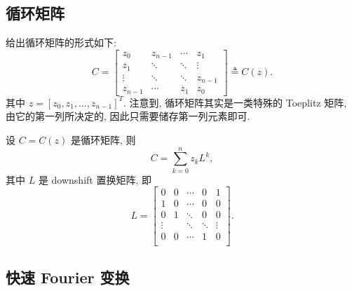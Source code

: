 \documentclass{ecnumaster}
\newcommand{\dis}{\displaystyle}
\begin{document}
\subsection{循环矩阵}
给出循环矩阵的形式如下:
\begin{equation}\label{eq:circulant-matrix}
  C = \left[\begin{matrix} z_0 & z_{n-1} & \cdots & z_{1}\\
  z_1 & \ddots & \ddots & \vdots \\
  \vdots & \ddots & \ddots & z_{n-1}  \\
  z_{n-1} & \cdots & z_1 & z_0  \end{matrix} \right] \triangleq C(z).
\end{equation}
其中 $z = [z_0, z_1, \dots, z_{n-1}]^T.$
注意到, 循环矩阵其实是一类特殊的 Toeplitz 矩阵,
由它的第一列所决定的, 因此只需要储存第一列元素即可.

\begin{lemma}\label{lemma23}
  设 $C = C(z)$ 是循环矩阵, 则
  $$C = \sum_{k=0}^nz_kL^k,$$
  其中 $L$ 是 downshift 置换矩阵\cite{GL13}, 即
  $$L = \left[ \begin{matrix}
    0 & 0 & \cdots & 0 & 1 \\
    1 & 0 & \cdots & 0 & 0 \\
    0 & 1 & \ddots & 0 & 0 \\
    \vdots &  & \ddots & \ddots & \vdots \\
    0 & 0 & \cdots & 1 & 0 \\
  \end{matrix}\right].$$
\end{lemma}

\subsection{快速 Fourier 变换}


\end{document}
